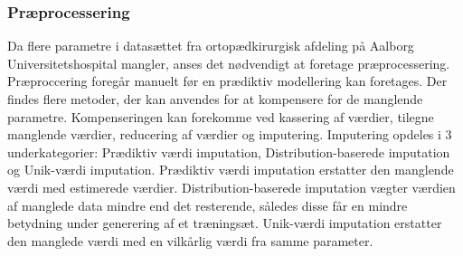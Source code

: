 \subsubsection{Præprocessering}
Da flere parametre i datasættet fra ortopædkirurgisk afdeling på Aalborg Universitetshospital mangler, anses det nødvendigt at foretage præprocessering. Præproccering foregår manuelt før en prædiktiv modellering kan foretages.
Der findes flere metoder, der kan anvendes for at kompensere for de manglende parametre. Kompenseringen kan forekomme ved kassering af værdier, tilegne manglende værdier, reducering af værdier og imputering. Imputering opdeles i 3 underkategorier: Prædiktiv værdi imputation, Distribution-baserede imputation og Unik-værdi imputation. Prædiktiv værdi imputation erstatter den manglende værdi med estimerede værdier. Distribution-baserede imputation vægter værdien af manglede data mindre end det resterende, således disse får en mindre betydning under generering af et træningsæt. Unik-værdi imputation  erstatter den manglede værdi med en vilkårlig værdi fra samme parameter.\cite{Saar2007} 


